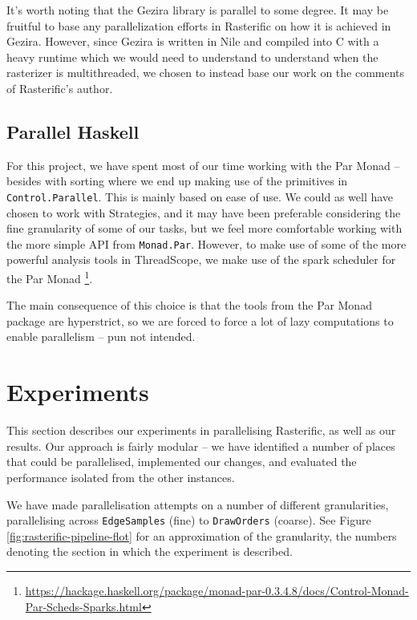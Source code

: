 \documentclass[12pt, a4paper]{article}
\begin{document}
It's worth noting that the Gezira library is parallel to some degree. It may be fruitful to base any parallelization efforts in Rasterific on how it is achieved in Gezira. However,
since Gezira is written in Nile and compiled into C with a heavy runtime which we would need to understand to understand when the rasterizer is multithreaded, we chosen to instead
 base our work on the comments of Rasterific's author.
\subsection{Parallel Haskell}
For this project, we have spent most of our time working with the Par Monad -- besides with sorting where we end up making use of the primitives in \texttt{Control.Parallel}.
 This is mainly based on ease of use. We could as well have chosen to work with Strategies, and it may
have been preferable considering the fine granularity of some of our tasks, but we feel more comfortable working with the more simple API from \texttt{Monad.Par}.
However, to make use of some of the more powerful analysis tools in ThreadScope, we make use of the spark scheduler for the Par Monad
\footnote{\url{https://hackage.haskell.org/package/monad-par-0.3.4.8/docs/Control-Monad-Par-Scheds-Sparks.html}}.

The main consequence of this choice is that the tools from the Par Monad package are hyperstrict, so we are forced to force a lot of lazy computations to enable parallelism -- pun not intended.




\section{Experiments}\label{experiments}

This section describes our experiments in parallelising Rasterific, as well as our results. Our approach is fairly modular -- we have identified a number of places that could be parallelised, implemented our changes, and evaluated the performance isolated from the other instances.

We have made parallelisation attempts on a number of different granularities, parallelising across \texttt{EdgeSamples} (fine) to \texttt{DrawOrders} (coarse). See Figure \ref{fig:rasterific-pipeline-flot} for an approximation of the granularity, the numbers denoting the section in which the experiment is described.
\end{document}
